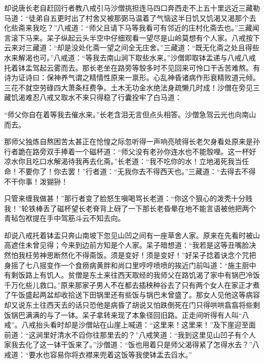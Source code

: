 \documentclass[12pt,UTF8]{ctexbook}
\begin{document}
却说唐长老自赶回行者教八戒引马沙僧挑担连马四口奔西走不上五十里远近三藏勒马道：“徒弟自五更时出了村舍又被那弼马温着了气恼这半日饥又饥渴又渴那个去化些斋来我吃？”八戒道：“师父且请下马等我看可有邻近的庄村化斋去也。”三藏闻言滚下马来。呆子纵起云头半空中仔细观看一望尽是山岭莫想有个人家。八戒按下云来对三藏道：“却是没处化斋一望之间全无庄舍。”三藏道：“既无化斋之处且得些水来解渴也可。”八戒道：“等我去南山涧下取些水来。”沙僧即取钵盂递与八戒八戒托着钵盂驾起云雾而去。那长老坐在路旁等彀多时不见回来可怜口干舌苦难熬。有诗为证诗曰：保神养气谓之精情性原来一禀形。心乱神昏诸病作形衰精败道元倾。三花不就空劳碌四大萧条枉费争。土木无功金水绝法身疏懒几时成！沙僧在旁见三藏饥渴难忍八戒又取水不来只得稳了行囊拴牢了白马道：

“师父你自在着等我去催水来。”长老含泪无言但点头相答。沙僧急驾云光也向南山而去。

那师父独炼自熬困苦太甚正在怆惶之际忽听得一声响亮唬得长老欠身看处原来是孙行者跪在路旁双手捧着一个磁杯道：“师父没有老孙你连水也不能彀哩。这一杯好凉水你且吃口水解渴待我再去化斋。”长老道：“我不吃你的水！立地渴死我当任命！不要你了！你去罢！”行者道：“无我你去不得西天也。”三藏道：“去得去不得不干你事！泼猢狲！

只管来缠我做甚！”那行者变了脸怒生嗔喝骂长老道：“你这个狠心的泼秃十分贱我！”轮铁棒丢了磁杯望长老脊背上砑了一下那长老昏晕在地不能言语被他把两个青毡包袱提在手中驾筋斗云不知去向。

却说八戒托着钵盂只奔山南坡下忽见山凹之间有一座草舍人家。原来在先看时被山高遮住未曾见得；今来到边前方知是个人家。呆子暗想道：“我若是这等丑嘴脸决然怕我枉劳神思断然化不得斋饭。须是变好！须是变好！”好呆子捻着诀念个咒把身摇了七八摇变作一个食痨病黄胖和尚口里哼哼喷喷的挨近门前叫道：“施主厨中有剩饭路上有饥人。贫僧是东土来往西天取经的我师父在路饥渴了家中有锅巴冷饭千万化些儿救口。”原来那家子男人不在都去插秧种谷去了只有两个女人在家正才煮了午饭盛起两盆却收拾送下田锅里还有些饭与锅巴未曾盛了。那女人见他这等病容却又说东土往西天去的话只恐他是病昏了胡说又怕跌倒死在门只得哄哄翕翕将些剩饭锅巴满满的与了一钵。呆子拿转来现了本象径回旧路。正走间听得有人叫“八戒”。八戒抬头看时却是沙僧站在山崖上喊道：“这里来！这里来！”及下崖迎至面前道：“这涧里好清水不舀你往那里去的？”八戒笑道：“我到这里见山凹子有个人家我去化了这一钵干饭来了。”沙僧道：“饭也用着只是师父渴得紧了怎得水去？”八戒道：“要水也容易你将衣襟来兜着这饭等我使钵盂去舀水。”
\end{document}
